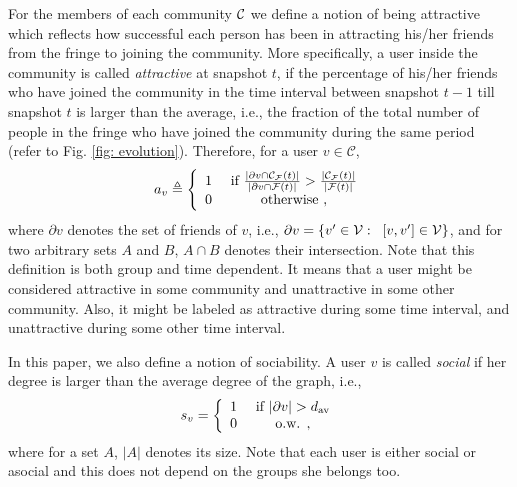 For the members of each community $\mathcal{C}$ we define a notion of being attractive which reflects how successful each person has been in attracting his/her friends from the fringe to joining the community. More specifically, a user inside the community is called \emph{attractive} at snapshot $t$, if the  percentage of his/her friends who have joined the community in the time interval between  snapshot $t-1$ till snapshot $t$  is larger than the average, i.e., the fraction of the total number of people in the fringe who have joined the community during the same period (refer to Fig. \ref{fig: evolution}).  Therefore, for a user $v\in\mathcal{C}$, 
\begin{align}
a_v\triangleq
\left\{\begin{array}{cc}      
                   1 & \textmd{ if }  \frac{|\partial v 
                   \cap \mathcal{C}_{\mathcal{F}}(t)|}
                   { |\partial v \cap  \mathcal{F}(t)|}> 
                   \frac{|\mathcal{C}_{\mathcal{F}}(t)|}{|\mathcal{F}(t)|}\\  
                   0 & \textmd{ otherwise },
                   \end{array}
\right.
\end{align}
where $\partial v$ denotes the set of friends of $v$, i.e., $\partial v=\{v'\in\mathcal{V}: \;\; [v,v']\in\mathcal{V}\}$, and for two arbitrary sets $A$  and $B$, $A \cap B$ denotes their intersection. 
Note that this definition is both group and time dependent. It means that a user might be considered attractive in some community and unattractive in some other community. Also, it might be labeled as attractive during some time interval, and unattractive during some other time interval.

In this paper, we also define  a notion of sociability.  A user $v$ is called \emph{social} if  her degree is larger than the average degree of the graph, i.e.,
\begin{align*}
                   s_v=\left\{\begin{array}{cc}
                   1 & \textmd{ if } |\partial v|>d_{\rm av}\\
                   0 & \textmd{ o.w. },
                   \end{array}
                   \right.
\end{align*}
where for a set $A$, $|A|$ denotes its size. Note that each user is either social or asocial and this does not depend on the groups she belongs too.






